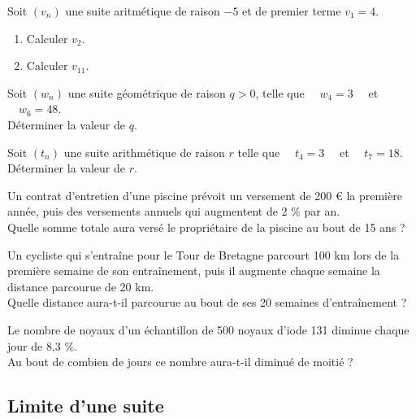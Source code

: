 \documentclass[a4paper,11pt,exos]{nsi} %
\begin{document}
\exo{}
Soit $(v_n)$ une suite aritmétique de raison $-5$ et de premier terme $v_1=4$.
\begin{multicols}{2}
\begin{enumerate}
    \item Calculer $v_2$.
    \item Calculer $v_{11}$.
\end{enumerate}
\end{multicols}

\exo{}
Soit $(w_n)$ une suite géométrique de raison $q>0$, telle que $\quad w_4=3\quad$ et $\quad w_6=48$.\\
Déterminer la valeur de $q$.

\exo{}
Soit $(t_n)$ une suite arithmétique de raison $r$ telle que $\quad t_4=3\quad$ et $\quad t_7=18$.\\
Déterminer la valeur de $r$.

\exo{}
Un contrat d'entretien d'une piscine prévoit un versement de 200 € la première année, puis des versements annuels qui augmentent de 2 \% par an.\\
Quelle somme totale aura versé le propriétaire de la piscine au bout de 15 ans ?

\exo{}
Un cycliste qui s'entraîne pour le Tour de Bretagne parcourt 100 km lors de la première semaine de son entraînement, puis il augmente chaque semaine la distance parcourue de 20 km.\\
Quelle distance aura-t-il parcourue au bout de ses 20 semaines d'entraînement ?

\exo{}
Le nombre de noyaux d'un échantillon de 500 noyaux d'iode 131 diminue chaque jour de 8,3 \%.\\
Au bout de combien de jours ce nombre aura-t-il diminué de moitié ?

\subsection*{Limite d'une suite}
\end{document}
